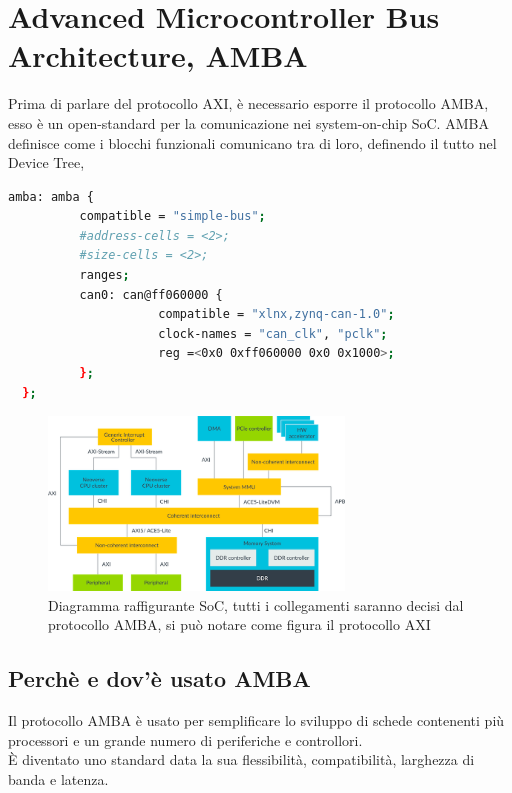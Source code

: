 \section{Advanced Microcontroller Bus Architecture, AMBA}
Prima di parlare del protocollo AXI, è necessario esporre il protocollo AMBA, esso è un open-standard per la comunicazione nei system-on-chip SoC. AMBA definisce come i blocchi funzionali comunicano tra di loro, definendo il tutto nel Device Tree,\cite{amba}
\begin{lstlisting}[language=sh, label=lst:C, caption={Questo è un esempio di un device tree che definisce la comunicazione di un core propretario tramite il protocollo CANBus.}]
  amba: amba {
          compatible = "simple-bus";
          #address-cells = <2>;
          #size-cells = <2>;
          ranges;
          can0: can@ff060000 {
                     compatible = "xlnx,zynq-can-1.0";
                     clock-names = "can_clk", "pclk";
                     reg =<0x0 0xff060000 0x0 0x1000>;
          };
  };
\end{lstlisting}
\begin{figure}
    \centering
    \includegraphics[width=0.7\textwidth]{images/AMBA.png}
    \caption{Diagramma raffigurante SoC, tutti i collegamenti saranno decisi dal protocollo AMBA, si può notare come figura il protocollo AXI\cite{amba}}
    \label{fig:my_label}
\end{figure}
\subsection{Perchè e dov'è usato AMBA}
Il protocollo AMBA è usato per semplificare lo sviluppo di schede contenenti più processori e un grande numero di periferiche e controllori.\\
È diventato uno standard data la sua flessibilità, compatibilità, larghezza di banda e latenza.
